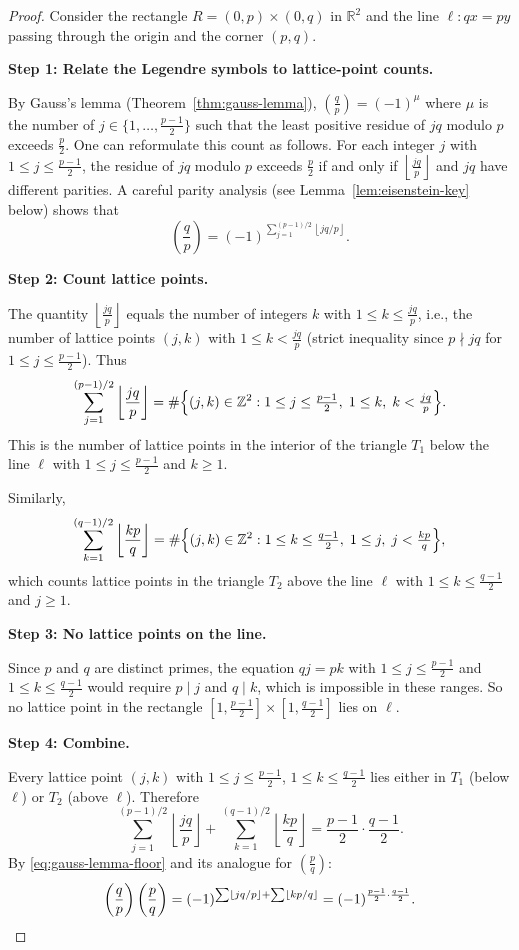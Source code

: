 \documentclass[12pt,a4paper,openany]{book}
\theoremstyle{definition}
\theoremstyle{plain}
\theoremstyle{remark}
\newcommand{\Z}{\mathbb{Z}}
\newcommand{\R}{\mathbb{R}}
\newcommand{\floor}[1]{\left\lfloor #1 \right\rfloor}
\newcommand{\legendre}[2]{\left(\frac{#1}{#2}\right)}
\begin{document}
\begin{proof}
Consider the rectangle $R = (0, p) \times (0, q)$ in $\R^2$ and the line
$\ell \colon qx = py$ passing through the origin and the corner $(p, q)$.

\medskip\noindent\textbf{Step 1: Relate the Legendre symbols to lattice-point counts.}

By Gauss's lemma (Theorem~\ref{thm:gauss-lemma}), $\legendre{q}{p} = (-1)^{\mu}$
where $\mu$ is the number of $j \in \{1, \ldots, \frac{p-1}{2}\}$ such that
the least positive residue of $jq$ modulo $p$ exceeds $\frac{p}{2}$.
One can reformulate this count as follows.
For each integer $j$ with $1 \leq j \leq \frac{p-1}{2}$, the residue of $jq$
modulo $p$ exceeds $\frac{p}{2}$ if and only if $\floor{\frac{jq}{p}}$ and $jq$
have different parities.
A careful parity analysis (see Lemma~\ref{lem:eisenstein-key} below) shows that
\begin{equation}
\label{eq:gauss-lemma-floor}
  \legendre{q}{p} = (-1)^{\sum_{j=1}^{(p-1)/2} \floor{jq/p}}.
\end{equation}

\medskip\noindent\textbf{Step 2: Count lattice points.}

The quantity $\floor{\frac{jq}{p}}$ equals the number of integers $k$ with
$1 \leq k \leq \frac{jq}{p}$, i.e., the number of lattice points $(j, k)$ with
$1 \leq k < \frac{jq}{p}$ (strict inequality since $p \nmid jq$ for
$1 \leq j \leq \frac{p-1}{2}$). Thus
\[
  \sum_{j=1}^{(p-1)/2} \floor{\frac{jq}{p}}
  = \#\Bigl\{(j,k) \in \Z^2 : 1 \leq j \leq \tfrac{p-1}{2},\;
    1 \leq k,\; k < \tfrac{jq}{p}\Bigr\}.
\]
This is the number of lattice points in the interior of the triangle $T_1$
below the line $\ell$ with $1 \leq j \leq \frac{p-1}{2}$ and $k \geq 1$.

Similarly,
\[
  \sum_{k=1}^{(q-1)/2} \floor{\frac{kp}{q}}
  = \#\Bigl\{(j,k) \in \Z^2 : 1 \leq k \leq \tfrac{q-1}{2},\;
    1 \leq j,\; j < \tfrac{kp}{q}\Bigr\},
\]
which counts lattice points in the triangle $T_2$ above the line $\ell$
with $1 \leq k \leq \frac{q-1}{2}$ and $j \geq 1$.

\medskip\noindent\textbf{Step 3: No lattice points on the line.}

Since $p$ and $q$ are distinct primes, the equation $qj = pk$ with
$1 \leq j \leq \frac{p-1}{2}$ and $1 \leq k \leq \frac{q-1}{2}$ would
require $p \mid j$ and $q \mid k$, which is impossible in these ranges.
So no lattice point in the rectangle $[1, \frac{p-1}{2}] \times [1, \frac{q-1}{2}]$
lies on $\ell$.

\medskip\noindent\textbf{Step 4: Combine.}

Every lattice point $(j,k)$ with $1 \leq j \leq \frac{p-1}{2}$,
$1 \leq k \leq \frac{q-1}{2}$ lies either in $T_1$ (below $\ell$) or
$T_2$ (above $\ell$). Therefore
\[
  \sum_{j=1}^{(p-1)/2} \floor{\frac{jq}{p}}
  + \sum_{k=1}^{(q-1)/2} \floor{\frac{kp}{q}}
  = \frac{p-1}{2} \cdot \frac{q-1}{2}.
\]
By \eqref{eq:gauss-lemma-floor} and its analogue for $\legendre{p}{q}$:
\[
  \legendre{q}{p}\legendre{p}{q}
  = (-1)^{\sum \floor{jq/p} + \sum \floor{kp/q}}
  = (-1)^{\frac{p-1}{2}\cdot\frac{q-1}{2}}. \qedhere
\]
\end{proof}
\end{document}

